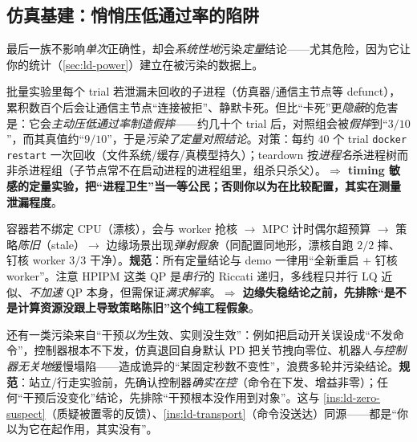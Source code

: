 \subsection{仿真基建：悄悄压低通过率的陷阱}
\label{subsec:ld-silent-infra}

最后一族不影响\emph{单次}正确性，却会\emph{系统性地}污染\emph{定量}结论——尤其危险，因为它让你的统计（\cref{sec:ld-power}）建立在被污染的数据上。

\begin{insight}\label{ins:ld-zombie}
批量实验里每个 trial 若泄漏未回收的子进程（仿真器/通信主节点等 defunct），累积数百个后会让通信主节点“连接被拒”、静默卡死。但比“卡死”更\emph{隐蔽}的危害是：它会\emph{主动压低通过率制造假摔}——约几十个 trial 后，对照组会被\emph{假摔}到“$3/10$”，而其真值约“$9/10$”，于是\emph{污染了定量对照结论}。对策：每约 $40$ 个 trial \texttt{docker restart} 一次回收（文件系统/缓存/真模型持久）；teardown 按\emph{进程名}杀进程树而非杀进程组（子节点常不在启动进程的进程组里，组杀只杀父）。\textbf{$\Rightarrow$ timing 敏感的定量实验，把“进程卫生”当一等公民；否则你以为在比较配置，其实在测量泄漏程度}。
\end{insight}

\begin{insight}[漂核 vs 钉核——抢核致策略陈旧的边缘弹射假象]\label{ins:ld-cpu-pin}
容器若不绑定 CPU（漂核），会与 worker 抢核 $\to$ MPC 计时偶尔超预算 $\to$ 策略\emph{陈旧}（stale）$\to$ 边缘场景出现\emph{弹射假象}（同配置同地形，漂核自跑 $2/2$ 摔、钉核 worker $3/3$ 干净）。\textbf{规范}：所有定量结论与 demo 一律用“全新重启 + 钉核 worker”。注意 HPIPM 这类 QP 是\emph{串行}的 Riccati 递归，多线程只并行 LQ 近似、\emph{不加速} QP 本身，但需保证\emph{满求解率}。\textbf{$\Rightarrow$ 边缘失稳结论之前，先排除“是不是计算资源没跟上导致策略陈旧”这个纯工程假象}。
\end{insight}

\begin{insight}\label{ins:ld-intervention}
还有一类污染来自“干预\emph{以为}生效、实则没生效”：例如把启动开关误设成“不发命令”，控制器根本不下发，仿真退回自身默认 PD 把关节拽向零位、机器人\emph{与控制器无关地}缓慢塌陷——造成诡异的“某固定秒数不变性”，浪费多轮并污染结论。\textbf{规范}：站立/行走实验前，先确认控制器\emph{确实在控}（命令在下发、增益非零）；任何“干预后没变化”结论，先排除“干预根本没作用到对象”。这与 \cref{ins:ld-zero-suspect}（质疑被置零的反馈）、\cref{ins:ld-transport}（命令没送达）同源——都是“你以为它在起作用，其实没有”。
\end{insight}

